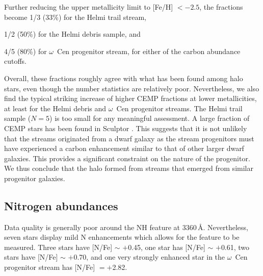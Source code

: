 \documentclass[twocolumn]{aastex63}
\begin{document}
Further reducing the upper metallicity limit to [Fe/H] $<-2.5$, the fractions become 1/3 (33\%) for the Helmi trail stream,

1/2 (50\%) for the Helmi debris sample, and 

4/5 (80\%) for $\omega$~Cen progenitor stream, for either of the carbon abundance cutoffs.

Overall, these fractions roughly agree with what has been found among halo stars, even though the number statistics are relatively poor. Nevertheless, we also find the typical striking increase of higher CEMP fractions at lower metallicities, at least for the Helmi debris and $\omega$~Cen progenitor streams. The Helmi trail sample ($N=5$) is too small for any meaningful assessment. A large fraction of CEMP stars
has been found in Sculptor \citep{chiti18}. This suggests that it is not unlikely that the streams originated from a dwarf galaxy as the stream progenitors must have experienced a carbon enhancement similar to that of other larger dwarf galaxies. 
This provides a significant constraint on the nature of the progenitor. We thus conclude that the halo formed from streams that emerged from similar progenitor galaxies.




\subsection{Nitrogen abundances} 
\label{sec:nitrogen}
Data quality is generally poor around the NH feature at 3360\,{\AA}. Nevertheless, seven stars display mild N enhancements which allows for the feature to be measured. Three stars have [N/Fe] $\sim$ $+$0.45, one star has [N/Fe] $\sim$ $+$0.61, two stars have [N/Fe] $\sim$ $+$0.70, and one very strongly enhanced star in the $\omega$~Cen progenitor stream has [N/Fe] $=+$2.82. 
\end{document}

